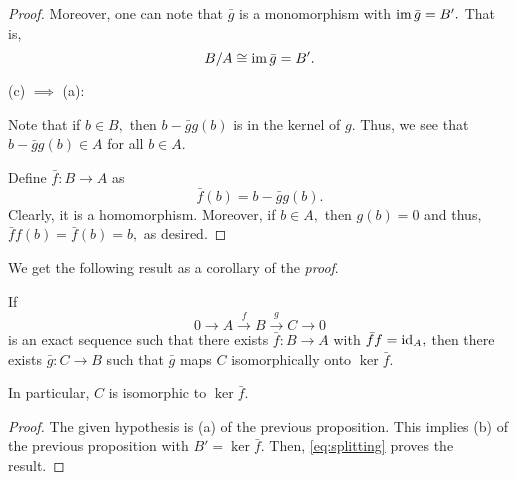 \documentclass[12pt]{article}
\begin{document}
\begin{proof}
	Moreover, one can note that $\bar{g}$ is a monomorphism with $\operatorname{im} \bar{g} = B'.$ That is, 
	\begin{equation} \label{eq:splitting}
		B/A \cong \operatorname{im} \bar{g} = B'.
	\end{equation}

	(c) $\implies$ (a):

	Note that if $b \in B,$ then $b - \bar{g}g(b)$ is in the kernel of $g.$ Thus, we see that $b - \bar{g}g(b) \in A$ for all $b \in A.$

	Define $\bar{f}:B \to A$ as
	\begin{equation*} 
		\bar{f}(b) = b - \bar{g}g(b).
	\end{equation*}
	Clearly, it is a homomorphism. Moreover, if $b \in A,$ then $g(b) = 0$ and thus, $\bar{f}f(b) = \bar{f}(b) = b,$ as desired.
\end{proof}	

We get the following result as a corollary of the \emph{proof}.

\begin{cor} \label{cor:splitsequences}
	If 
	\begin{equation*} 
		0 \to A \overset{f}{\longrightarrow} B \overset{g}{\longrightarrow} C \to 0
	\end{equation*}
	is an exact sequence such that there exists $\bar{f}:B \to A$ with $\bar{f}f = \operatorname{id}_A,$ then there exists $\bar{g}:C \to B$ such that $\bar{g}$ maps $C$ isomorphically onto $\ker \bar{f}.$

	In particular, $C$ is isomorphic to $\ker \bar{f}.$
\end{cor}
\begin{proof} 
	The given hypothesis is (a) of the previous proposition. This implies (b) of the previous proposition with $B' = \ker \bar{f}.$ Then, \cref{eq:splitting} proves the result.
\end{proof}
\end{document}
